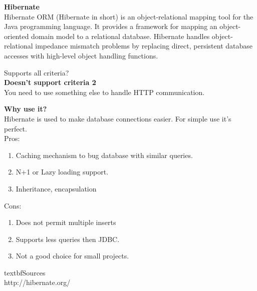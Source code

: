 		\textbf{Hibernate} \\
		Hibernate ORM (Hibernate in short) is an object-relational mapping tool for the Java programming language. It provides a framework for mapping an object-oriented domain model to a relational database. Hibernate handles object-relational impedance mismatch problems by replacing direct, persistent database accesses with high-level object handling functions.
		
		Supports all criteria?\\
		\textbf{Doesn't support criteria 2}\\
		You need to use something else to handle HTTP communication.
		
		\textbf{Why use it?} \\
		Hibernate is used to make database connections easier. For simple use it's perfect.\\
		
		Pros:
		\begin{enumerate}
		\item Caching mechanism to bug database with similar queries.
		\item N+1 or Lazy loading support.
		\item Inheritance, encapsulation
		\end{enumerate}
		Cons:
		\begin{enumerate}
		\item Does not permit multiple inserts
		\item Supports less queries then JDBC.
		\item Not a good choice for small projects.
		\end{enumerate}
	
	textbf{Sources}\\
	http://hibernate.org/